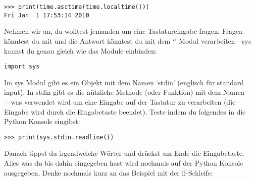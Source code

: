 \begin{Verbatim}[frame=single]
>>> print(time.asctime(time.localtime()))
Fri Jan  1 17:53:14 2010
\end{Verbatim}

Nehmen wir an, du wolltest jemanden um eine Tastatureingabe fragen. Fragen könntest du mit  und die Antwort könntest du mit dem `' Modul verarbeiten---sys kannst du genau gleich wie das  Module einbinden:

\begin{Verbatim}[frame=single]
import sys
\end{Verbatim}

Im sys Modul gibt es ein Objekt mit dem Namen `stdin' (englisch für standard input). In stdin gibt es die nützliche Methode (oder Funktion) mit dem Namen ---was verwendet wird um eine Eingabe auf der Tastatur zu verarbeiten (die Eingabe wird durch die Eingabetaste beendet). Teste  indem du folgendes in die Python Konsole eingibst:

\begin{Verbatim}[frame=single]
>>> print(sys.stdin.readline())
\end{Verbatim}

Danach tippst du irgendwelche Wörter und drückst am Ende die Eingabetaste. Alles was du bis dahin eingegeben hast wird nochmals auf der Python Konsole ausgegeben. Denke nochmals kurz an das Beispiel mit der if-Schleife:

